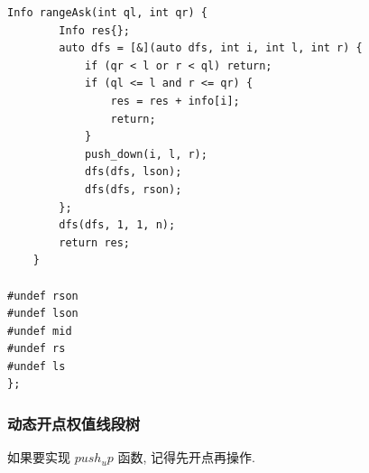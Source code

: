 \documentclass[UTF8, a4paper, titlepage, twoside]{ctexart}
\begin{document}
\begin{lstlisting}[style=cpp]
    Info rangeAsk(int ql, int qr) {
        Info res{};
        auto dfs = [&](auto dfs, int i, int l, int r) {
            if (qr < l or r < ql) return;
            if (ql <= l and r <= qr) {
                res = res + info[i];
                return;
            }
            push_down(i, l, r);
            dfs(dfs, lson);
            dfs(dfs, rson);
        };
        dfs(dfs, 1, 1, n);
        return res;
    }

#undef rson
#undef lson
#undef mid
#undef rs
#undef ls
};
\end{lstlisting}

\subsubsection{ 动态开点权值线段树 }

如果要实现 $push_up$ 函数, 记得先开点再操作.
\end{document}

